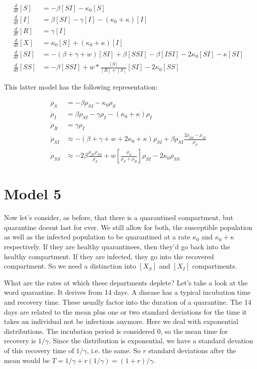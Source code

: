 \documentclass[a4paper,10pt]{article}
\begin{document}
\begin{align}
 \frac{d}{dt} [S]
 &=
 -\beta [SI] - \kappa_0[S]
 \\
 \frac{d}{dt} [I]
 &=
 \beta [SI] - \gamma [I] - (\kappa_0+\kappa)[I]
 \\
 \frac{d}{dt} [R]
 &=
\gamma [I]
 \\
  \frac{d}{dt} [X]
 &=
\kappa_0 [S] + (\kappa_0+\kappa)[I]
 \\
 \frac{d}{dt} [SI]
 &=
 -(\beta+\gamma+w)[SI] + \beta[SSI] -\beta[ISI] -2\kappa_0 [SI] - \kappa [SI] 
 \\
 \frac{d}{dt} [SS]
 &=
- \beta [SSI] + w*\frac{[S]}{[R]+[S]} [SI] -2\kappa_0 [SS]
 \end{align}
 
 This latter model has the following representation:
 
  \begin{align}
  \dot \rho_S
  &= 
  -\beta \rho_{SI} - \kappa_0\rho_S\\
\dot \rho_I 
  &=
   \beta \rho_{SI} - \gamma \rho_I  - (\kappa_0+\kappa) \rho_I\label{eq:rhoI4}
   \\
     \dot \rho_R 
  &=
    \gamma \rho_I\label{eq:rhoR4}
\\
    \dot \rho_{SI}
&\approx
-(\beta+\gamma+w +2\kappa_0 +\kappa) \rho_{SI} +\beta \rho_{SI}\frac{ 2 \rho_{SS}-\rho_{SI}  }{\rho_S}\label{eq:rhoSI4}
\\
    \dot \rho_{SS}
&\approx
-2\beta \frac{\rho_{SI} \rho_{SS}}{\rho_S}
+w\left[\frac{\rho_S}{\rho_S+\rho_R}\right]\rho_{SI} - 2\kappa_0\rho_{SS}
\label{eq:rhoSS4}
 \end{align}

\section{Model 5}

Now let's consider, as before, that there is a quarantined compartment, but quarantine doesnt last for ever. We still allow for both, the susceptible population as well as the infected population to be quarantined at a rate $\kappa_0$ and $\kappa_0+\kappa$ respectively. If they are healthy quarantinees, then they'd go back into the healthy compartment. If they are infected, they go into the recovered compartment. So we need a distinction into $[X_S]$ and $[X_I]$ compartments.

What are the rates at which these departments deplete? Let's take a look at the word quarantine. It derives from 14 days. A disease has a typical incubation time and recovery time. These usually factor into the duration of a quarantine. The 14 days are related to the mean plus one or two standard deviations for the time it takes an individual not be infectious anymore. Here we deal with exponential distributions. The incubation period is considered 0, so the mean time for recovery is $1/\gamma$. Since the distribution is exponential, we have a standard devation of this recovery time of $1/\gamma$, i.e. the same. So $r$ standard deviations after the mean would be $T=1/\gamma +r (1/\gamma)= (1+r)/\gamma$.
\end{document}
